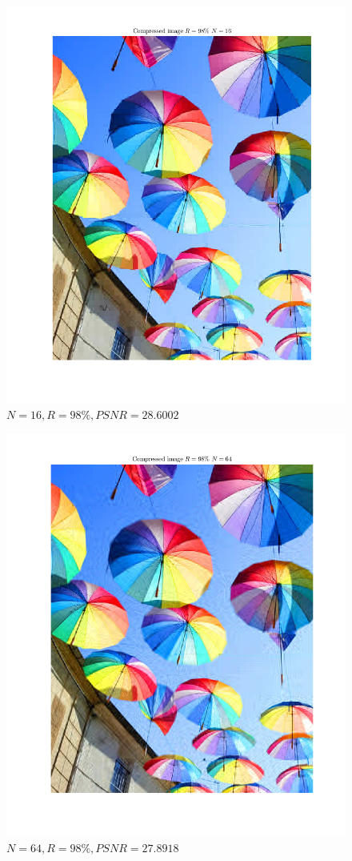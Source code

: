 \begin{figure}[H]
    \centering
    \includegraphics[width=\linewidth]{RIS_N16_R98.png}
    \caption{$N=16,R=98\%,PSNR=28.6002$}
    \label{fig:RIS_N16_R98}
\end{figure}
\begin{figure}[H]
    \centering
    \includegraphics[width=\linewidth]{RIS_N64_R98.png}
    \caption{$N=64,R=98\%,PSNR=27.8918$}
    \label{fig:RIS_N64_R98}
\end{figure}
